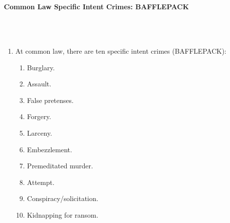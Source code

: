 \paragraph{Common Law Specific Intent Crimes: BAFFLEPACK}
~\\\\
\begin{enumerate}
    \item At common law, there are ten specific intent crimes (BAFFLEPACK):
    \begin{enumerate}
        \item Burglary.
        \item Assault.
        \item False pretenses.
        \item Forgery.
        \item Larceny.
        \item Embezzlement.
        \item Premeditated murder.
        \item Attempt.
        \item Conspiracy/solicitation.
        \item Kidnapping for ransom.
    \end{enumerate}
\end{enumerate}

